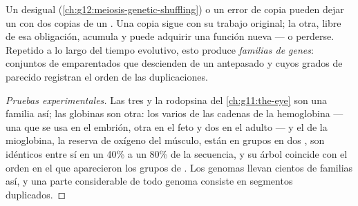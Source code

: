 \begin{proposition}\label{prop:g12:diversification-of-life:duplication}
Un  desigual (\cref{ch:g12:meiosis-genetic-shuffling}) o
un error de copia pueden dejar un  con dos copias de un .
Una copia sigue con su trabajo original; la otra, libre de esa
obligación, acumula  y puede adquirir una función nueva --- o
perderse. Repetido a lo largo del tiempo evolutivo, esto produce
\emph{familias de genes}: conjuntos de 
emparentados que descienden de un antepasado y cuyos grados de parecido
registran el orden de las duplicaciones.
\end{proposition}
\begin{proof}[Pruebas experimentales]
Las tres  y la rodopsina del \cref{ch:g11:the-eye} son una
familia así; las globinas son otra: los varios  de las cadenas de
la hemoglobina --- una que se usa en el embrión, otra en el feto y dos
en el adulto --- y el  de la mioglobina, la reserva de oxígeno del
músculo, están en grupos en dos , son idénticos entre sí en
un 40\% a un 80\% de la secuencia, y su árbol coincide con el orden en
el que aparecieron los grupos de . Los genomas llevan
cientos de familias así, y una parte considerable de todo genoma
consiste en segmentos duplicados.
\end{proof}

